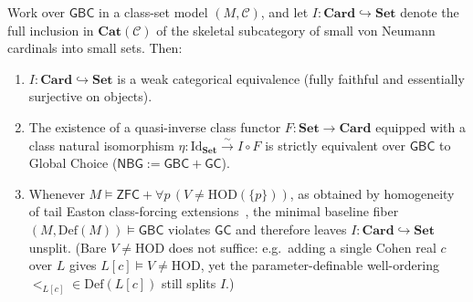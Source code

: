 \begin{proposition}\label{prop:large-equiv-splitting}%
%
\leanwitness%
%
Work over $\mathsf{GBC}$ in a class-set model $(M, \mathcal{C})$, and let $I : \mathbf{Card} \hookrightarrow \mathbf{Set}$ denote the full inclusion in $\mathbf{Cat}(\mathcal{C})$ of the skeletal subcategory of small von Neumann cardinals into small sets. Then:
\begin{enumerate}[label=\textup{(\roman*)},leftmargin=1.8em]
  \item $I : \mathbf{Card} \hookrightarrow \mathbf{Set}$ is a weak categorical equivalence (fully faithful and essentially surjective on objects).
  \item The existence of a quasi-inverse class functor $F : \mathbf{Set} \to \mathbf{Card}$ equipped with a class natural isomorphism $\eta : \mathrm{Id}_{\mathbf{Set}} \xrightarrow{\sim} I \circ F$ is strictly equivalent over $\mathsf{GBC}$ to Global Choice ($\mathsf{NBG} := \mathsf{GBC} + \mathsf{GC}$).
  \item Whenever $M \models \mathsf{ZFC} + \forall p\,(V \neq \mathrm{HOD}(\{p\}))$, as obtained by homogeneity of tail Easton class-forcing extensions~\cite{Easton70}, the minimal baseline fiber $(M, \mathrm{Def}(M)) \models \mathsf{GBC}$ violates $\mathsf{GC}$ and therefore leaves $I : \mathbf{Card} \hookrightarrow \mathbf{Set}$ unsplit. (Bare $V \neq \mathrm{HOD}$ does not suffice: e.g.\ adding a single Cohen real $c$ over $L$ gives $L[c] \models V \neq \mathrm{HOD}$, yet the parameter-definable well-ordering $<_{L[c]} \in \mathrm{Def}(L[c])$ still splits $I$.)
\end{enumerate}
\end{proposition}

